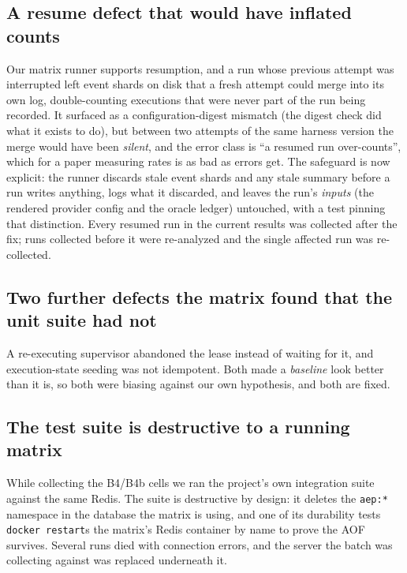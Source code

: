 \documentclass[10pt,journal,compsoc]{IEEEtran}
\begin{document}
\subsection{A resume defect that would have inflated counts}

Our matrix runner supports resumption, and a run whose previous attempt was
interrupted left event shards on disk that a fresh attempt could merge into its
own log, double-counting executions that were never part of the run being
recorded. It surfaced as a configuration-digest mismatch (the digest check
did what it exists to do), but between two attempts of the same harness
version the merge would have been \emph{silent}, and the error class is ``a
resumed run over-counts'', which for a paper measuring rates is as bad as errors
get. The safeguard is now explicit: the runner discards stale event shards and
any stale summary before a run writes anything, logs what it discarded, and
leaves the run's \emph{inputs} (the rendered provider config and the oracle
ledger) untouched, with a test pinning that distinction. Every resumed run in
the current results was collected after the fix; runs collected before it were
re-analyzed and the single affected run was re-collected.

\subsection{Two further defects the matrix found that the unit suite had not}

A re-executing supervisor abandoned the lease instead of waiting for it, and
execution-state seeding was not idempotent. Both made a \emph{baseline} look
better than it is, so both were biasing against our own hypothesis, and both are
fixed.

\subsection{The test suite is destructive to a running matrix}

While collecting the B4/B4b cells we ran the project's own integration suite
against the same Redis. The suite is destructive by design: it deletes the
\texttt{aep:*} namespace in the database the matrix is using, and one of its
durability tests \texttt{docker restart}s the matrix's Redis container by name to
prove the AOF survives. Several runs died with connection errors, and the server
the batch was collecting against was replaced underneath it.
\end{document}
